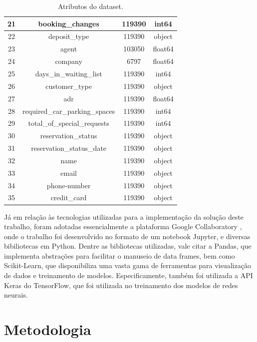 \documentclass{homework}
\begin{document}
\begin{table}[h!]
\begin{tabular}{|c|c|c|c|}
        \hline
        21 & booking\_changes & 119390 & int64 \\
        \hline
        22 & deposit\_type & 119390 & object \\
        \hline
        23 & agent & 103050 & float64 \\
        \hline
        24 & company & 6797 & float64 \\
        \hline
        25 & days\_in\_waiting\_list & 119390 & int64 \\
        \hline
        26 & customer\_type & 119390 & object \\
        \hline
        27 & adr & 119390 & float64 \\
        \hline
        28 & required\_car\_parking\_spaces & 119390 & int64 \\
        \hline
        29 & total\_of\_special\_requests & 119390 & int64 \\
        \hline
        30 & reservation\_status & 119390 & object \\
        \hline
        31 & reservation\_status\_date & 119390 & object \\
        \hline
        32 & name & 119390 & object \\
        \hline
        33 & email & 119390 & object \\
        \hline
        34 & phone-number & 119390 & object \\
        \hline
        35 & credit\_card & 119390 & object \\
        \hline
    \end{tabular}
    \caption{Atributos do dataset.}
    \label{attributes}
\end{table}

Já em relação às tecnologias utilizadas para a implementação da solução deste trabalho, foram adotadas essencialmente a
plataforma Google Collaboratory \cite{colab}, onde o trabalho foi desenvolvido no formato de um notebook Jupyter, e
diversas bibiliotecas em Python. Dentre as bibliotecas utilizadas, vale citar a Pandas, que implementa abstrações para
facilitar o manuseio de data frames, bem como Scikit-Learn, que disponibiliza uma vasta gama de ferramentas para
visualização de dados e treinamento de modelos. Especificamente, também foi utilizada a API Keras do TensorFlow, que foi
utilizada no treinamento dos modelos de redes neurais.

\section{Metodologia}
\end{document}
